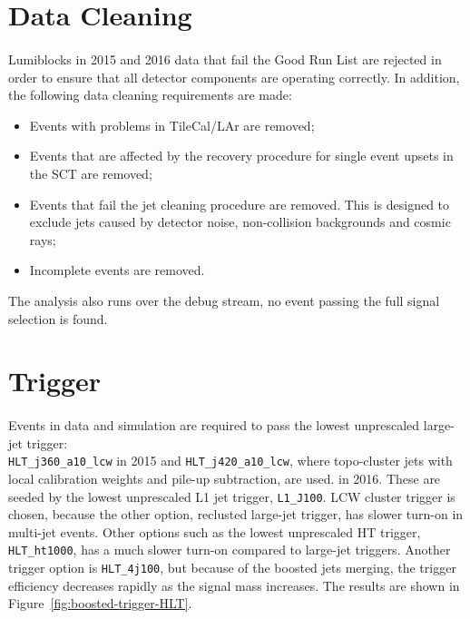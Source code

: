 \section{Data Cleaning}
\label{evt-sel:cleaning}
\paragraph{}
Lumiblocks in 2015 and 2016 data that fail the Good Run List are rejected in order to ensure that all detector components are operating correctly. In addition, the following data cleaning requirements are made:
\begin{itemize}
\item Events with problems in TileCal/LAr are removed;
\item Events that are affected by the recovery procedure for single event upsets in the SCT are removed;
\item Events that fail the jet cleaning procedure are removed. This is designed to exclude jets caused by detector noise, non-collision backgrounds and cosmic rays;
\item Incomplete events are removed.
\end{itemize}
The analysis also runs over the debug stream, no event passing the full signal selection is found.


\section{Trigger}
\label{evt-sel:trig}
\paragraph{}
Events in data and simulation are required to pass the lowest unprescaled large-\R jet trigger: \\
\verb|HLT_j360_a10_lcw| in 2015 and \verb|HLT_j420_a10_lcw|, where topo-cluster jets with local calibration weights and pile-up subtraction, are used. in 2016. These are seeded by the lowest unprescaled L1 jet trigger, \texttt{L1\_J100}. LCW cluster trigger is chosen, because the other option, reclusted large-\R jet trigger, has slower turn-on in multi-jet events. Other options such as the lowest unprescaled HT trigger, \verb|HLT_ht1000|, has a much slower turn-on compared to large-\R jet triggers. Another trigger option is \verb|HLT_4j100|, but because of the boosted jets merging, the trigger efficiency decreases rapidly as the signal mass increases. The results are shown in Figure~\ref{fig:boosted-trigger-HLT}.

